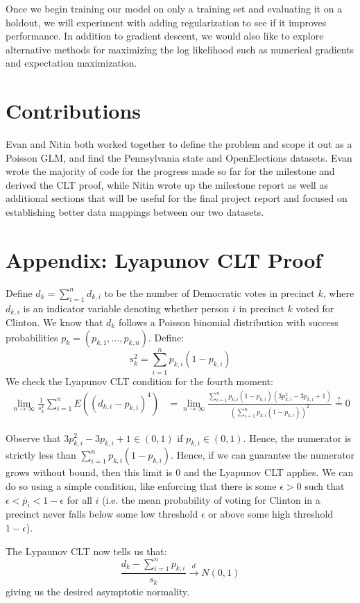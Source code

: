 \documentclass[10pt, letterpaper]{article}
\begin{document}
Once we begin training our model on only a training set and evaluating it on a holdout, we will experiment with adding regularization to see if it improves performance. In addition to gradient descent, we would also like to explore alternative methods for maximizing the log likelihood such as numerical gradients and expectation maximization.

\section{Contributions}
Evan and Nitin both worked together to define the problem and scope it out as a Poisson GLM, and find the Pennsylvania state and OpenElections datasets. Evan wrote the majority of code for the progress made so far for the milestone and derived the CLT proof, while Nitin wrote up the milestone report as well as additional sections that will be useful for the final project report and focused on establishing better data mappings between our two datasets.


\newpage
\section*{Appendix: Lyapunov CLT Proof}

Define $d_k = \sum_{i = 1}^n d_{k, i}$ to be the number of Democratic votes in precinct $k$, where $d_{k, i}$ is an indicator variable denoting whether person $i$ in precinct $k$ voted for Clinton. We know that $d_k$ follows a Poisson binomial distribution with success probabilities $p_k = (p_{k, 1}, \dots, p_{k, n})$. Define:
\[ s_{k}^2 = \sum_{i = 1}^{n} p_{k, i} (1-p_{k, i}) \] 
We check the Lyapunov CLT condition for the fourth moment: 
\begin{align*}
\lim_{n \to \infty} \frac{1}{s_k^4} \sum_{i = 1}^n E \left( (d_{k, i} - p_{k, i})^4 \right) &= \lim_{n \to \infty} \frac{\sum_{i = 1}^n p_{k, i}(1-p_{k, i}) \left( 3p_{k, i}^2 - 3p_{k, i} + 1 \right)}{\left(\sum_{i = 1}^n p_{k, i} \left( 1- p_{k, i} \right) \right)^2} \stackrel{?} = 0 
\end{align*}

Observe that $3p_{k, i}^2 - 3p_{k, i} + 1 \in (0, 1)$ if $p_{k, i} \in (0, 1)$. Hence, the numerator is strictly less than $\sum_{i = 1}^n p_{k, i} (1 - p_{k, i})$. Hence, if we can guarantee the numerator grows without bound, then this limit is 0 and the Lyapunov CLT applies. We can do so using a simple condition, like enforcing that there is some $\epsilon > 0$ such that $\epsilon < \bar p_i < 1- \epsilon$ for all $i$ (i.e. the mean probability of voting for Clinton in a precinct never falls below some low threshold $\epsilon$ or above some high threshold $1-\epsilon$). 

The Lypaunov CLT now tells us that: 
\[ \frac{d_k - \sum_{i = 1}^{n} p_{k, i} }{s_k} \stackrel{d} \longrightarrow N(0, 1) \] 
giving us the desired asymptotic normality. 

{\small


}
\end{document}
